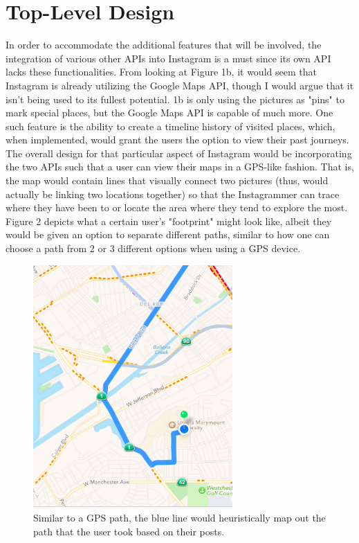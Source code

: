 \documentclass[11pt]{article}
\begin{document}
\section{Top-Level Design}
\label{Top-Level Design}
   \indent 
   \indent In order to accommodate the additional features that will be involved, the integration of various other APIs into Instagram is a must since its own API lacks these functionalities. From looking at Figure 1b, it would seem that Instagram is already utilizing the Google Maps API, though I would argue that it isn't being used to its fullest potential. 1b is only using the pictures as "pins" to mark special places, but the Google Maps API is capable of much more. One such feature is the ability to create a timeline history of visited places, which, when implemented, would grant the users the option to view their past journeys. The overall design for that particular aspect of Instagram would be incorporating the two APIs such that a user can view their maps in a GPS-like fashion. That is, the map would contain lines that visually connect two pictures (thus, would actually be linking two locations together) so that the Instagrammer can trace where they have been to or locate the area where they tend to explore the most. Figure 2 depicts what a certain user's "footprint" might look like, albeit they would be given an option to separate different paths, similar to how one can choose a path from 2 or 3 different options when using a GPS device. \\
   
\begin{figure}[ht]
\centering
\includegraphics[width=3in]{images/gps.png}
\caption{Similar to a GPS path, the blue line would heuristically map out the path that the user took based on their posts.}
\label{travel_history}
\end{figure}
\end{document}

